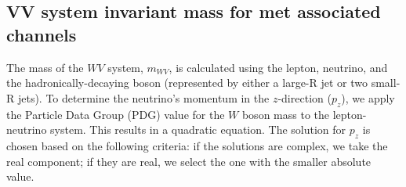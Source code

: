
\subsection{VV system invariant mass for met associated channels}
\label{subsubsec:mVV_reconstruction}

The mass of the $WV$ system, $m_{WV}$, is calculated using the lepton, neutrino, and the hadronically-decaying boson (represented by either a large-R jet or two small-R jets). To determine the neutrino's momentum in the $z$-direction ($p_z$), we apply the Particle Data Group (PDG) value for the $W$ boson mass to the lepton-neutrino system. This results in a quadratic equation. The solution for $p_z$ is chosen based on the following criteria: if the solutions are complex, we take the real component; if they are real, we select the one with the smaller absolute value.


